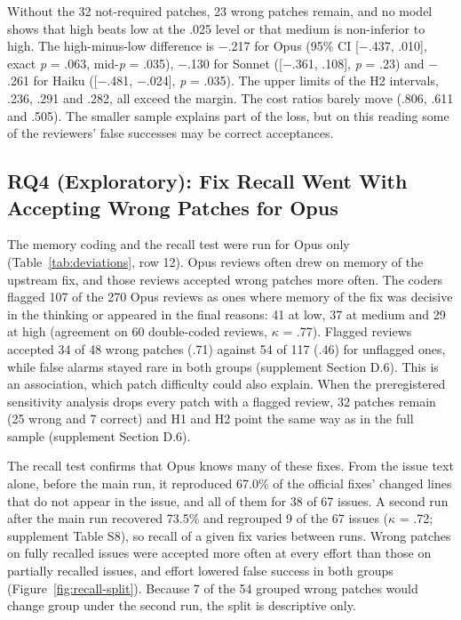 \documentclass[sigconf,nonacm]{acmart}
\begin{document}
Without the 32 not-required patches, 23 wrong patches remain, and no model shows that high beats low at the .025 level or that medium is non-inferior to high. The high-minus-low difference is $-$.217 for Opus (95\% CI [$-$.437, .010], exact \textit{p} = .063, mid-\textit{p} = .035), $-$.130 for Sonnet ([$-$.361, .108], \textit{p} = .23) and $-$.261 for Haiku ([$-$.481, $-$.024], \textit{p} = .035). The upper limits of the H2 intervals, .236, .291 and .282, all exceed the margin. The cost ratios barely move (.806, .611 and .505). The smaller sample explains part of the loss, but on this reading some of the reviewers' false successes may be correct acceptances.

\subsection{RQ4 (Exploratory): Fix Recall Went With Accepting Wrong Patches for Opus}\label{sec:memory}

The memory coding and the recall test were run for Opus only (Table~\ref{tab:deviations}, row 12). Opus reviews often drew on memory of the upstream fix, and those reviews accepted wrong patches more often. The coders flagged 107 of the 270 Opus reviews as ones where memory of the fix was decisive in the thinking or appeared in the final reasons: 41 at low, 37 at medium and 29 at high (agreement on 60 double-coded reviews, $\kappa$ = .77). Flagged reviews accepted 34 of 48 wrong patches (.71) against 54 of 117 (.46) for unflagged ones, while false alarms stayed rare in both groups (supplement Section D.6). This is an association, which patch difficulty could also explain. When the preregistered sensitivity analysis drops every patch with a flagged review, 32 patches remain (25 wrong and 7 correct) and H1 and H2 point the same way as in the full sample (supplement Section D.6).

The recall test confirms that Opus knows many of these fixes. From the issue text alone, before the main run, it reproduced 67.0\% of the official fixes' changed lines that do not appear in the issue, and all of them for 38 of 67 issues. A second run after the main run recovered 73.5\% and regrouped 9 of the 67 issues ($\kappa$ = .72; supplement Table S8), so recall of a given fix varies between runs. Wrong patches on fully recalled issues were accepted more often at every effort than those on partially recalled issues, and effort lowered false success in both groups (Figure~\ref{fig:recall-split}). Because 7 of the 54 grouped wrong patches would change group under the second run, the split is descriptive only.
\end{document}
